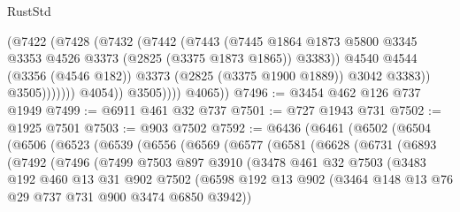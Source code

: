 \begin{lexlean}{RustStd}
\begin{coremodule}
                              (@7422
                                (@7428
                                  (@7432
                                    (@7442
                                      (@7443
                                        (@7445
                                          @1864
                                          @1873
                                          @5800
                                          @3345
                                          @3353
                                          @4526
                                          @3373
                                          (@2825 (@3375 @1873 @1865))
                                          @3383))
                                      @4540
                                      @4544
                                      (@3356 (@4546 @182))
                                      @3373
                                      (@2825 (@3375 @1900 @1889))
                                      @3042
                                      @3383))
                                  @3505)))))))
                    @4054))
                @3505))))
        @4065))
@7496 := @3454 @462 @126 @737 @1949
@7499 := @6911 @461 @32 @737
@7501 := @727 @1943 @731
@7502 := @1925 @7501
@7503 := @903 @7502
@7592 := @6436
    (@6461
      (@6502
        (@6504
          (@6506
            (@6523
              (@6539
                (@6556
                  (@6569
                    (@6577
                      (@6581
                        (@6628
                          (@6731
                            (@6893
                              (@7492
                                (@7496
                                  (@7499
                                    @7503
                                    @897
                                    @3910
                                    (@3478
                                      @461
                                      @32
                                      @7503
                                      (@3483
                                        @192
                                        @460
                                        @13
                                        @31
                                        @902
                                        @7502
                                        (@6598
                                          @192
                                          @13
                                          @902
                                          (@3464 @148 @13 @76 @29 @737 @731 @900 @3474 @6850 @3942))

\end{coremodule}
\end{lexlean}
